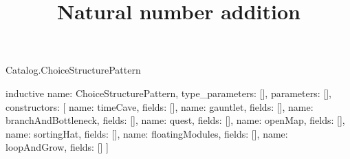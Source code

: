 \begin{lexlean}{Catalog.ChoiceStructurePattern}
\title{Natural number addition}
\begin{semanticmodule}
inductive{
  name: ChoiceStructurePattern,
  type_parameters: [],
  parameters: [],
  constructors: [
    {name: timeCave, fields: []},
    {name: gauntlet, fields: []},
    {name: branchAndBottleneck, fields: []},
    {name: quest, fields: []},
    {name: openMap, fields: []},
    {name: sortingHat, fields: []},
    {name: floatingModules, fields: []},
    {name: loopAndGrow, fields: []}
  ]
}
\end{semanticmodule}
\end{lexlean}
